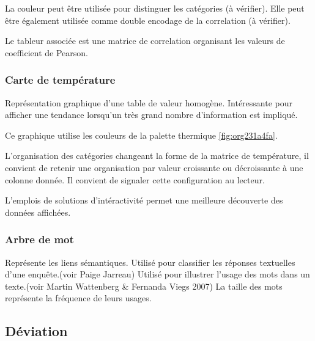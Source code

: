 \documentclass[a4paper,12pt]{article}
\begin{document}
\begin{multicols}{2}
La couleur peut être utilisée pour distinguer les catégories (à vérifier). Elle peut être également utilisée comme double encodage de la correlation (à vérifier).

Le tableur associée est une matrice de correlation organisant les valeurs de coefficient de Pearson.
\subsubsection*{Carte de température}
\label{sec:orga7939f3}
Représentation graphique d'une table de valeur homogène. \autocite{sosulskiGraphics2019}
Intéressante pour afficher une tendance lorsqu'un très grand nombre d'information est impliqué.

Ce graphique utilise les couleurs de la palette thermique \ref{fig:org231a4fa}.

L'organisation des catégories changeant la forme de la matrice de température, il convient de retenir une organisation par valeur croissante ou décroissante à une colonne donnée. Il convient de signaler cette configuration au lecteur. \autocite{wilkeVisualizingAmounts2019}

L'emplois de solutions d'intéractivité permet une meilleure découverte des données affichées.
\subsubsection*{Arbre de mot}
\label{sec:org1735d58}
Représente les liens sémantiques.
Utilisé pour classifier les réponses textuelles d'une enquête.(voir Paige Jarreau)
Utilisé pour illustrer l'usage des mots dans un texte.(voir Martin Wattenberg \& Fernanda Viegs 2007)
La taille des mots représente la fréquence de leurs usages. \autocite{jonathanschwabishQualitative2021}
\subsection*{Déviation}
\label{sec:org8809c93}


\end{multicols}
\end{document}
